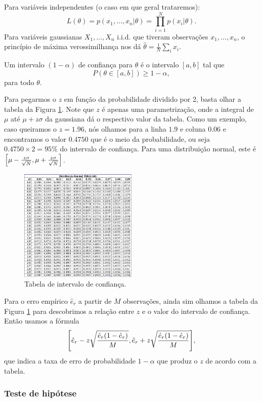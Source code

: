\documentclass[a4paper,fleqn,12pt]{article}
\begin{document}
Para variáveis independentes (o caso em que geral trataremos):
$$
L(\theta) = p(x_1, \ldots, x_n | \theta) = \prod_{i=1}^N p(x_i | \theta).
$$
Para variáveis gaussianas $X_1, \ldots, X_n$ i.i.d. que tiveram observações $x_1, \ldots, x_n$, o princípio de máxima verossimilhança nos dá $\hat{\theta} = \frac{1}{N} \sum_i x_i $.

Um intervalo $(1-\alpha)$ de confiança para $\theta$ é o intervalo $[a, b]$ tal que
$$
P(\theta \in [a, b]) \geq 1-\alpha,
$$
para todo $\theta$.

Para pegarmos o $z$ em função da probabilidade dividido por 2, basta olhar a tabela da Figura \ref{fig:z-tabela}. Note que $z$ é apenas uma parametrização, onde a integral de $\mu$ até $\mu + z \sigma$ da gaussiana dá o respectivo valor da tabela. Como um exemplo, caso queiramos o $z = 1.96$, nós olhamos para a linha $1.9$ e coluna $0.06$ e encontramos o valor $0.4750$ que é o meio da probabilidade, ou seja $0.4750 \times 2 = 95\%$ do intervalo de confiança. Para uma distribuição normal, este é $\qty[\mu - \frac{z \sigma}{\sqrt{N}}, \mu + \frac{z \sigma}{\sqrt{N}}]$.
\begin{figure}[H]
\centering
\includegraphics[width=0.5\textwidth]{fig/z-tabela.png}
\caption{Tabela de intervalo de confiança.}
\label{fig:z-tabela}
\end{figure}

Para o erro empírico $\hat{e}_r$ a partir de $M$ observações, ainda sim olhamos a tabela da Figura \ref{fig:z-tabela} para descobrimos a relação entre $z$ e o valor do intervalo de confiança. Então usamos a fórmula
$$
\qty[\hat{e}_r - z \sqrt{\frac{\hat{e}_r(1-\hat{e}_r)}{M}},
\hat{e}_r + z \sqrt{\frac{\hat{e}_r(1-\hat{e}_r)}{M}}],
$$
que indica a taxa de erro de probabilidade $1-\alpha$ que produz o $z$ de acordo com a tabela.

\subsubsection{Teste de hipótese}
\end{document}
